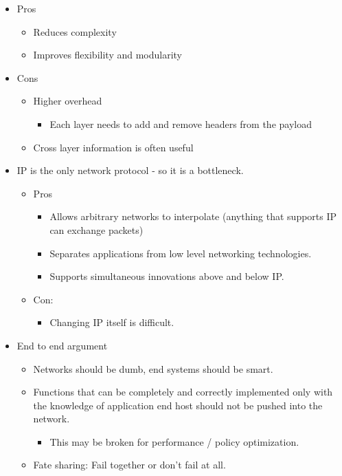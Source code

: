 \documentclass[]{article}
\providecommand{\tightlist}{%
  \setlength{\itemsep}{0pt}\setlength{\parskip}{0pt}}
\begin{document}
\begin{itemize}
\tightlist
\item
  Pros

  \begin{itemize}
  \tightlist
  \item
    Reduces complexity
  \item
    Improves flexibility and modularity
  \end{itemize}
\item
  Cons

  \begin{itemize}
  \tightlist
  \item
    Higher overhead

    \begin{itemize}
    \tightlist
    \item
      Each layer needs to add and remove headers from the payload
    \end{itemize}
  \item
    Cross layer information is often useful
  \end{itemize}
\item
  IP is the only network protocol - so it is a bottleneck.

  \begin{itemize}
  \tightlist
  \item
    Pros

    \begin{itemize}
    \tightlist
    \item
      Allows arbitrary networks to interpolate (anything that supports
      IP can exchange packets)
    \item
      Separates applications from low level networking technologies.
    \item
      Supports simultaneous innovations above and below IP.
    \end{itemize}
  \item
    Con:

    \begin{itemize}
    \tightlist
    \item
      Changing IP itself is difficult.
    \end{itemize}
  \end{itemize}
\item
  End to end argument

  \begin{itemize}
  \tightlist
  \item
    Networks should be dumb, end systems should be smart.
  \item
    Functions that can be completely and correctly implemented only with
    the knowledge of application end host should not be pushed into the
    network.

    \begin{itemize}
    \tightlist
    \item
      This may be broken for performance / policy optimization.
    \end{itemize}
  \item
    Fate sharing: Fail together or don't fail at all.
  \end{itemize}
\end{itemize}
\end{document}
